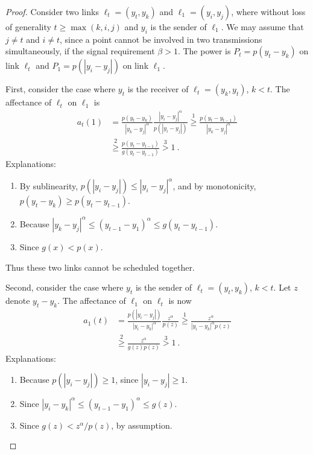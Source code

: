 \documentclass[11pt]{amsart}
\begin{document}
\begin{proof}
Consider two links $\ell_t=(y_t,y_k)$ and $\ell_1=(y_i, y_j)$, where 
without loss of generality $t \ge \max(k,i,j)$ and 
$y_i$ is the sender of $\ell_1$.  
We may assume that $j \neq t$ and $i \neq t$, since a point
cannot be involved in two transmissions simultaneously, if the signal
requirement $\beta >
1$.  The power is $P_t = p(y_t - y_k)$ on link $\ell_t$ and $P_1 = p(|y_i
- y_j|)$ on link $\ell_1$.

First, consider the case where $y_t$ is the receiver of $\ell_t = (y_k,
y_t)$, $k < t$. 
The affectance of $\ell_t$ on $\ell_1$ is
\begin{align*}
 a_{t}(1) & = \frac{p(y_t - y_{k})}{|y_k - y_j|^{\alpha}}
   \frac{|y_i - y_j|^{\alpha}}{ p(|y_i - y_j|)}
 \overset{1}{\geq} \frac{p(y_t - y_{t-1})}{|y_k - y_j|^{\alpha}} \\
& \overset{2}{\geq} \frac{p(y_t - y_{t-1})}{g(y_t - y_{t-1})} 
 \overset{3}{>} 1\ .
\end{align*}
Explanations:
\begin{enumerate}
\item By sublinearity, $p(|y_i-y_j|) \le |y_i - y_j|^\alpha$, 
  and by monotonicity, $p(y_t - y_k) \ge p(y_t - y_{t-1})$.
\item Because $|y_k - y_j|^\alpha \le (y_{t-1} - y_1)^\alpha \le g(y_t - y_{t-1})$.
\item Since $g(x) < p(x)$.
\end{enumerate}
Thus these two links cannot be scheduled together.

Second, consider the case where $y_t$ is the sender of $\ell_t = (y_t,
y_k)$, $k < t$.  Let $z$ denote $y_t - y_k$.
The affectance of $\ell_1$ on $\ell_t$ is now
\begin{align*}
a_{1}(t) & = \frac{p(|y_i - y_j|)}{|y_i - y_k|^{\alpha}}
     \frac{z^{\alpha}}{p(z)}
\overset{1}{\geq}  \frac{z^{\alpha}}{|y_i - y_k|^\alpha p(z)} \\
& \overset{2}{\geq} \frac{z^{\alpha}}{g(z) p(z)}
\overset{3}{>} 1 \ .
\end{align*}
Explanations:
\begin{enumerate}
\item Because $p(|y_i - y_j|) \ge 1$, since $|y_i - y_j| \ge 1$.
\item Since $|y_i - y_k|^\alpha \le (y_{t-1} - y_1)^\alpha \le g(z)$.
\item Since $g(z) < z^\alpha/p(z)$, by assumption.   \end{enumerate}
\vspace{-2em}
\end{proof}
\end{document}
